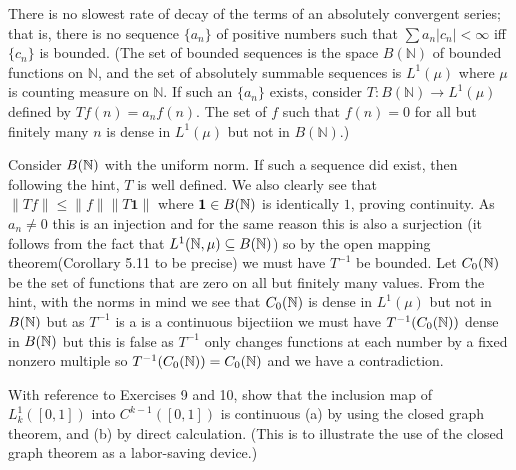\documentclass[12pt,a4paper]{article}
\begin{document}
\begin{problem}\label{prob:5-33}
There is no slowest rate of decay of the terms of an absolutely convergent series; that is, there is no sequence $\{a_n\}$ of positive numbers such that $\sum a_n |c_n| < \infty$ iff $\{c_n\}$ is bounded. (The set of bounded sequences is the space $B(\mathbb{N})$ of bounded functions on $\mathbb{N}$, and the set of absolutely summable sequences is $L^1(\mu)$ where $\mu$ is counting measure on $\mathbb{N}$. If such an $\{a_n\}$ exists, consider $T : B(\mathbb{N}) \rightarrow L^1(\mu)$ defined by $Tf(n) = a_n f(n)$. The set of $f$ such that $f(n)=0$ for all but finitely many $n$ is dense in $L^1(\mu)$ but not in $B(\mathbb{N})$.)
\end{problem}
\begin{solution}
    Consider $B(\mathbb{N})$ with the uniform norm. 
    If such a sequence did exist, then following the hint, $T$ is well defined. 
    We also clearly see that $\|Tf\|\leq\|f\|\|T\mathbf{1}\|$ where $\mathbf{1}\in B(\mathbb{N})$ is identically $1$, proving continuity. 
    As $a_n\neq 0$ this is an injection and for the same reason this is also a surjection (it follows from the fact that $L^1(\mathbb{N},\mu) \subseteq B(\mathbb{N})$) so by the open mapping theorem(Corollary 5.11 to be precise) we must have $T^{-1}$ be bounded. 
    Let $C_0(\mathbb{N})$ be the set of functions that are zero on all but finitely many values. 
    From the hint, with the norms in mind we see that $C_0(\mathbb{N})$ is dense in $L^1(\mu)$ but not in $B(\mathbb{N})$ but as $T^{-1}$ is a is a continuous bijectiion we must have $T^{-1}(C_0(\mathbb{N}))$ dense in $B(\mathbb{N})$ but this is false as $T^{-1}$ only changes functions at each number by a fixed nonzero multiple so $T^{-1}(C_0(\mathbb{N}))=C_0(\mathbb{N})$ and we have a contradiction. 
\end{solution}
\begin{problem}\label{prob:5-34}
With reference to Exercises 9 and 10, show that the inclusion map of $L_k^1([0,1])$ into $C^{k-1}([0,1])$ is continuous (a) by using the closed graph theorem, and (b) by direct calculation. (This is to illustrate the use of the closed graph theorem as a labor-saving device.)
\end{problem}
\end{document}
